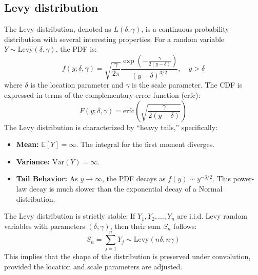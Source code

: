 \documentclass[12pt]{article}
\begin{document}
\begin{singlespace}
\subsection{Levy distribution}
The Levy distribution, denoted as $L(\delta, \gamma)$, is a continuous probability distribution with several interesting properties. For a random variable $Y \sim \text{Levy}(\delta, \gamma)$, the PDF is:
\begin{equation}
f(y; \delta, \gamma) = \sqrt{\frac{\gamma}{2\pi}} \frac{\exp\left( -\frac{\gamma}{2(y-\delta)} \right)}{(y-\delta)^{3/2}}, \quad y > \delta
\end{equation}
where $\delta$ is the location parameter and $\gamma$ is the scale parameter.
The CDF is expressed in terms of the complementary error function ($\text{erfc}$):
\begin{equation}
F(y; \delta, \gamma) = \text{erfc}\left( \sqrt{\frac{\gamma}{2(y-\delta)}} \right)
\end{equation}
The Levy distribution is characterized by ``heavy tails,'' specifically:
\begin{itemize}
    \item \textbf{Mean:} $\mathbb{E}[Y] = \infty$. The integral for the first moment diverges.
    \item \textbf{Variance:} $\text{Var}(Y) = \infty$.
    \item \textbf{Tail Behavior:} As $y \to \infty$, the PDF decays as $f(y) \sim y^{-3/2}$. This power-law decay is much slower than the exponential decay of a Normal distribution.
\end{itemize}
The Levy distribution is strictly stable. If $Y_1, Y_2, \dots, Y_n$ are i.i.d. Levy random variables with parameters $(\delta, \gamma)$, then their sum $S_n$ follows:
\begin{equation}
S_n = \sum_{j=1}^n Y_j \sim \text{Levy}(n\delta, n\gamma)
\end{equation}
This implies that the shape of the distribution is preserved under convolution, provided the location and scale parameters are adjusted.


\end{singlespace}
\end{document}
